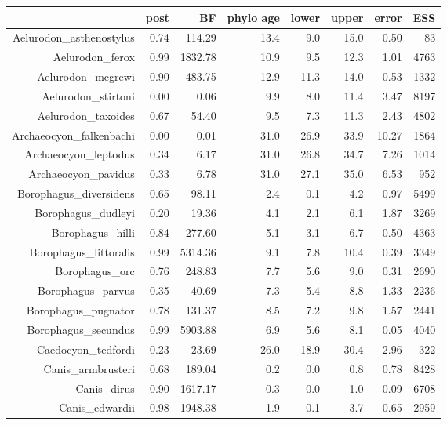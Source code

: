 \begin{table}[ht]
\centering
\begin{tabular}{rrrrrrrr}
  \hline
 & post & BF & phylo age & lower & upper & error & ESS \\ 
  \hline
Aelurodon\_asthenostylus & 0.74 & 114.29 & 13.4 & 9.0 & 15.0 & 0.50 & 83 \\ 
  Aelurodon\_ferox & 0.99 & 1832.78 & 10.9 & 9.5 & 12.3 & 1.01 & 4763 \\ 
  Aelurodon\_mcgrewi & 0.90 & 483.75 & 12.9 & 11.3 & 14.0 & 0.53 & 1332 \\ 
  Aelurodon\_stirtoni & 0.00 & 0.06 & 9.9 & 8.0 & 11.4 & 3.47 & 8197 \\ 
  Aelurodon\_taxoides & 0.67 & 54.40 & 9.5 & 7.3 & 11.3 & 2.43 & 4802 \\ 
  Archaeocyon\_falkenbachi & 0.00 & 0.01 & 31.0 & 26.9 & 33.9 & 10.27 & 1864 \\ 
  Archaeocyon\_leptodus & 0.34 & 6.17 & 31.0 & 26.8 & 34.7 & 7.26 & 1014 \\ 
  Archaeocyon\_pavidus & 0.33 & 6.78 & 31.0 & 27.1 & 35.0 & 6.53 & 952 \\ 
  Borophagus\_diversidens & 0.65 & 98.11 & 2.4 & 0.1 & 4.2 & 0.97 & 5499 \\ 
  Borophagus\_dudleyi & 0.20 & 19.36 & 4.1 & 2.1 & 6.1 & 1.87 & 3269 \\ 
  Borophagus\_hilli & 0.84 & 277.60 & 5.1 & 3.1 & 6.7 & 0.50 & 4363 \\ 
  Borophagus\_littoralis & 0.99 & 5314.36 & 9.1 & 7.8 & 10.4 & 0.39 & 3349 \\ 
  Borophagus\_orc & 0.76 & 248.83 & 7.7 & 5.6 & 9.0 & 0.31 & 2690 \\ 
  Borophagus\_parvus & 0.35 & 40.69 & 7.3 & 5.4 & 8.8 & 1.33 & 2236 \\ 
  Borophagus\_pugnator & 0.78 & 131.37 & 8.5 & 7.2 & 9.8 & 1.57 & 2441 \\ 
  Borophagus\_secundus & 0.99 & 5903.88 & 6.9 & 5.6 & 8.1 & 0.05 & 4040 \\ 
  Caedocyon\_tedfordi & 0.23 & 23.69 & 26.0 & 18.9 & 30.4 & 2.96 & 322 \\ 
  Canis\_armbrusteri & 0.68 & 189.04 & 0.2 & 0.0 & 0.8 & 0.78 & 8428 \\ 
  Canis\_dirus & 0.90 & 1617.17 & 0.3 & 0.0 & 1.0 & 0.09 & 6708 \\ 
  Canis\_edwardii & 0.98 & 1948.38 & 1.9 & 0.1 & 3.7 & 0.65 & 2959 \\ 

\end{tabular}
\end{table}

